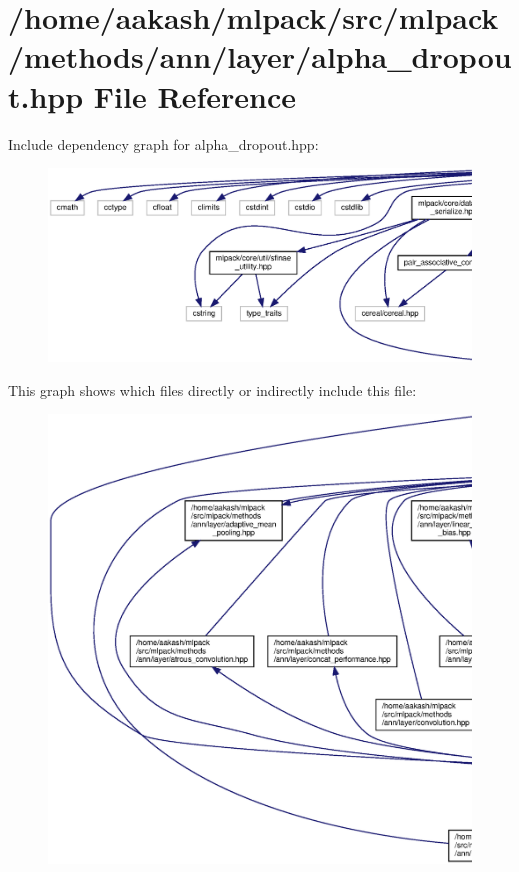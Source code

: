 \section{/home/aakash/mlpack/src/mlpack/methods/ann/layer/alpha\+\_\+dropout.hpp File Reference}
\label{alpha__dropout_8hpp}
Include dependency graph for alpha\+\_\+dropout.\+hpp\+:
\nopagebreak
\begin{figure}[H]
\begin{center}
\leavevmode
\includegraphics[width=350pt]{alpha__dropout_8hpp__incl}
\end{center}
\end{figure}
This graph shows which files directly or indirectly include this file\+:
\nopagebreak
\begin{figure}[H]
\begin{center}
\leavevmode
\includegraphics[width=350pt]{alpha__dropout_8hpp__dep__incl}
\end{center}
\end{figure}
